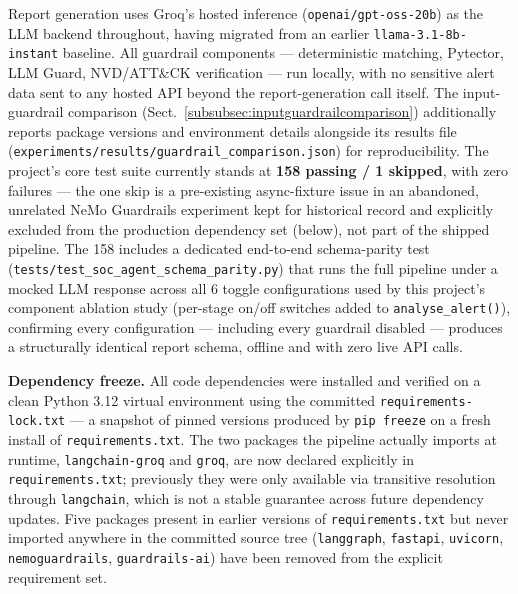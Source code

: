 \documentclass[pdflatex,sn-mathphys-num]{sn-jnl}%
\begin{document}
Report generation uses Groq's \cite{groq} hosted inference
(\texttt{openai/gpt-oss-20b}) as the LLM backend throughout, having
migrated from an earlier \texttt{llama-3.1-8b-instant} baseline. All
guardrail components --- deterministic matching, Pytector, LLM Guard,
NVD/ATT\&CK verification --- run locally, with no sensitive alert data
sent to any hosted API beyond the report-generation call itself. The
input-guardrail comparison (Sect.~\ref{subsubsec:inputguardrailcomparison})
additionally reports package versions and environment details alongside
its results file
(\texttt{experiments/results/guardrail\_comparison.json}) for
reproducibility. The project's core test suite currently stands at
\textbf{158 passing / 1 skipped}, with zero failures --- the one skip
is a pre-existing async-fixture issue in an abandoned, unrelated NeMo
Guardrails experiment kept for historical record and explicitly
excluded from the production dependency set (below), not part of the
shipped pipeline. The 158 includes a dedicated end-to-end schema-parity
test (\texttt{tests/test\_soc\_agent\_schema\_parity.py}) that runs the
full pipeline under a mocked LLM response across all 6 toggle
configurations used by this project's component ablation study
(per-stage on/off switches added to \texttt{analyse\_alert()}),
confirming every configuration --- including every guardrail
disabled --- produces a structurally identical report schema, offline
and with zero live API calls.

\textbf{Dependency freeze.} All code dependencies were installed and
verified on a clean Python 3.12 virtual environment using the
committed \texttt{requirements-lock.txt} --- a snapshot of pinned
versions produced by \texttt{pip freeze} on a fresh install of
\texttt{requirements.txt}. The two packages the pipeline actually
imports at runtime, \texttt{langchain-groq} and \texttt{groq}, are now
declared explicitly in \texttt{requirements.txt}; previously they were
only available via transitive resolution through \texttt{langchain},
which is not a stable guarantee across future dependency updates. Five
packages present in earlier versions of \texttt{requirements.txt} but
never imported anywhere in the committed source tree
(\texttt{langgraph}, \texttt{fastapi}, \texttt{uvicorn},
\texttt{nemoguardrails}, \texttt{guardrails-ai}) have been removed from
the explicit requirement set.
\end{document}

